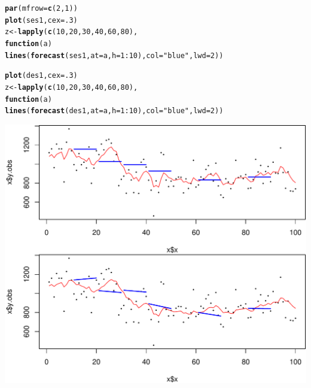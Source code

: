 \documentclass[10pt]{article}\usepackage[]{graphicx}\usepackage[]{color}
\makeatletter
\def\maxwidth{ %
  \ifdim\Gin@nat@width>\linewidth
    \linewidth
  \else
    \Gin@nat@width
  \fi
}
\newcommand{\hlnum}[1]{\textcolor[rgb]{0.686,0.059,0.569}{#1}}%
\newcommand{\hlstr}[1]{\textcolor[rgb]{0.192,0.494,0.8}{#1}}%
\newcommand{\hlopt}[1]{\textcolor[rgb]{0,0,0}{#1}}%
\newcommand{\hlstd}[1]{\textcolor[rgb]{0.345,0.345,0.345}{#1}}%
\newcommand{\hlkwa}[1]{\textcolor[rgb]{0.161,0.373,0.58}{\textbf{#1}}}%
\newcommand{\hlkwb}[1]{\textcolor[rgb]{0.69,0.353,0.396}{#1}}%
\newcommand{\hlkwc}[1]{\textcolor[rgb]{0.333,0.667,0.333}{#1}}%
\newcommand{\hlkwd}[1]{\textcolor[rgb]{0.737,0.353,0.396}{\textbf{#1}}}%
\newenvironment{kframe}{%
 \def\at@end@of@kframe{}%
 \ifinner\ifhmode%
  \def\at@end@of@kframe{\end{minipage}}%
  \begin{minipage}{\columnwidth}%
 \fi\fi%
 \def\FrameCommand##1{\hskip\@totalleftmargin \hskip-\fboxsep
 \colorbox{shadecolor}{##1}\hskip-\fboxsep
     \hskip-\linewidth \hskip-\@totalleftmargin \hskip\columnwidth}%
 \MakeFramed {\advance\hsize-\width
   \@totalleftmargin\z@ \linewidth\hsize
   \@setminipage}}%
 {\par\unskip\endMakeFramed%
 \at@end@of@kframe}
\newenvironment{knitrout}{}{} %
\makeatother
\begin{document}
\begin{knitrout}
\color{fgcolor}\begin{kframe}
\begin{alltt}
\hlkwd{par}\hlstd{(}\hlkwc{mfrow}\hlstd{=}\hlkwd{c}\hlstd{(}\hlnum{2}\hlstd{,}\hlnum{1}\hlstd{))}
\hlkwd{plot}\hlstd{(ses1,} \hlkwc{cex}\hlstd{=}\hlnum{.3}\hlstd{)}
\hlstd{z} \hlkwb{<-} \hlkwd{lapply}\hlstd{(}\hlkwd{c}\hlstd{(}\hlnum{10}\hlstd{,} \hlnum{20}\hlstd{,} \hlnum{30}\hlstd{,} \hlnum{40}\hlstd{,} \hlnum{60}\hlstd{,} \hlnum{80}\hlstd{),}
       \hlkwa{function}\hlstd{(}\hlkwc{a}\hlstd{)}
           \hlkwd{lines}\hlstd{(}\hlkwd{forecast}\hlstd{(ses1,} \hlkwc{at}\hlstd{=a,} \hlkwc{h}\hlstd{=}\hlnum{1}\hlopt{:}\hlnum{10}\hlstd{),} \hlkwc{col}\hlstd{=}\hlstr{"blue"}\hlstd{,} \hlkwc{lwd}\hlstd{=}\hlnum{2}\hlstd{))}

\hlkwd{plot}\hlstd{(des1,} \hlkwc{cex}\hlstd{=}\hlnum{.3}\hlstd{)}
\hlstd{z} \hlkwb{<-} \hlkwd{lapply}\hlstd{(}\hlkwd{c}\hlstd{(}\hlnum{10}\hlstd{,} \hlnum{20}\hlstd{,} \hlnum{30}\hlstd{,} \hlnum{40}\hlstd{,} \hlnum{60}\hlstd{,} \hlnum{80}\hlstd{),}
       \hlkwa{function}\hlstd{(}\hlkwc{a}\hlstd{)}
           \hlkwd{lines}\hlstd{(}\hlkwd{forecast}\hlstd{(des1,} \hlkwc{at}\hlstd{=a,} \hlkwc{h}\hlstd{=}\hlnum{1}\hlopt{:}\hlnum{10}\hlstd{),} \hlkwc{col}\hlstd{=}\hlstr{"blue"}\hlstd{,} \hlkwc{lwd}\hlstd{=}\hlnum{2}\hlstd{))}
\end{alltt}
\end{kframe}
\includegraphics[width=\maxwidth]{fig/graphunnamed-chunk-7-1} 

\end{knitrout}
\end{document}
